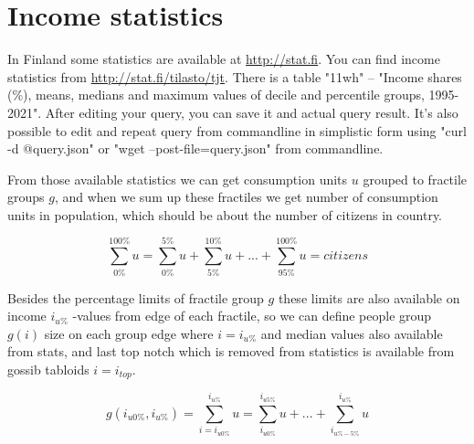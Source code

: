 %
%
%
\chapter{Income statistics}
\label{statistics}
In Finland some statistics are available at \url{http://stat.fi}.
You can find income statistics from \url{http://stat.fi/tilasto/tjt}.
There is a table "11wh" -- "Income shares (\%),
means, medians and maximum values of decile and percentile groups, 1995-2021".
After editing your query, you can save it and actual query result.
It's also possible to edit and repeat query from commandline in simplistic form
using "curl -d @query.json" or "wget --post-file=query.json" from commandline.

From those available statistics we can get consumption units
$u$ grouped to fractile groups $g$,
and when we sum up these fractiles we get number of consumption units in population,
which should be about the number of citizens in country.  

\begin{equation} \label{eq:fractile_units_sum}
	\sum_{0\%}^{100\%} u =
	\sum_{0\%}^{5\%} u +
	\sum_{5\%}^{10\%} u +
	...+
	\sum_{95\%}^{100\%} u = citizens
\end{equation}

Besides the percentage limits of fractile group $g$
these limits are also available on income $i_{u\%}$ -values from edge of each fractile,
so we can define people group $g(i)$ size on each group edge where
$i=i_{u\%}$ and median values also available from stats,
and last top notch which is removed from statistics is available from gossib tabloids
$i=i_{top}$.

\begin{equation} \label{eq:fractile_units_group}
	g(i_{u0\%},i_{u\%})=
        \sum_{i=i_{u0\%}}^{i_{u\%}} u =
	\sum_{i_{u0\%}}^{i_{u5\%}} u+
	...+
	\sum_{i_{u\%-5\%}}^{i_{u\%}} u
\end{equation}

